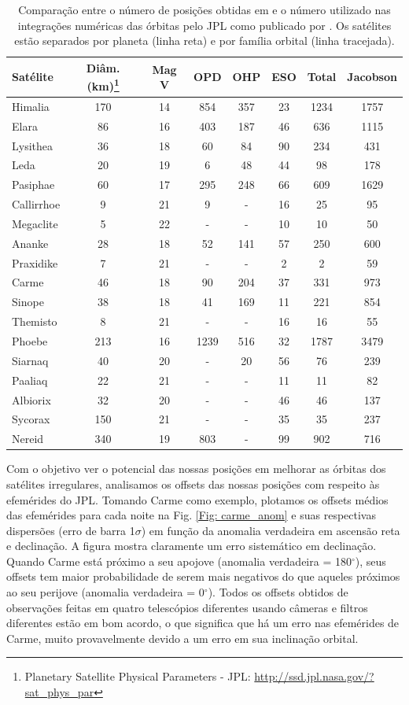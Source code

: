 \documentclass[12pt,a4paper]{monografia}
\newcommand{\degr}{\ensuremath{^{\circ}}}%
\begin{document}
\begin{table}[h]
\caption{\label{Tab: comparison-horizons} Comparação entre o número de posições obtidas em \cite{GomesJunior2015-Irregular} e o número utilizado nas integrações numéricas das órbitas pelo JPL como publicado por  \cite{Jacobson2012}. Os satélites estão separados por planeta (linha reta) e por família orbital (linha tracejada).}
\begin{centering}
\begin{tabular}{lccccccc}
\hline  \hline
Satélite & Diâm. (km)\footnote{Planetary Satellite Physical Parameters - JPL: \url{http://ssd.jpl.nasa.gov/?sat_phys_par}} & Mag V  & OPD  & OHP & ESO & Total  & Jacobson \tabularnewline
\hline
Himalia & 170 & 14 & 854 & 357 & 23 & 1234 & 1757 \tabularnewline
Elara & 86 & 16 & 403 & 187 & 46 & 636 & 1115 \tabularnewline
Lysithea & 36 & 18 & 60 & 84 & 90 & 234 & 431 \tabularnewline
Leda & 20 & 19 & 6 & 48 & 44 & 98 & 178 \tabularnewline
\hdashline
Pasiphae & 60 & 17 & 295 & 248 & 66 & 609 & 1629 \tabularnewline
Callirrhoe & 9 & 21 & 9 & -  &  16 & 25 & 95 \tabularnewline
Megaclite & 5 & 22 & - & -  &  10 & 10 & 50  \tabularnewline
\hdashline
Ananke & 28 & 18 & 52 & 141 & 57 & 250 & 600 \tabularnewline
Praxidike & 7 & 21 & - & -  &   2 & 2 & 59 \tabularnewline
\hdashline
Carme & 46 & 18 & 90 & 204 & 37 & 331 & 973 \tabularnewline
Sinope & 38 & 18 & 41 & 169 & 11 & 221 & 854 \tabularnewline
Themisto & 8 & 21 & - & - & 16 & 16 & 55 \tabularnewline
\hline
Phoebe & 213 & 16 & 1239 & 516 & 32 & 1787 & 3479 \tabularnewline
\hdashline
Siarnaq & 40 & 20 & - & 20 & 56 & 76 & 239 \tabularnewline
Paaliaq & 22 & 21 & - & - & 11 & 11 & 82 \tabularnewline
\hdashline
Albiorix & 32 & 20 & - & - & 46 & 46 & 137 \tabularnewline
\hline
Sycorax & 150 & 21 & - & - & 35 & 35 & 237 \tabularnewline
\hline
Nereid & 340 & 19 & 803 & - & 99 & 902 & 716 \tabularnewline
\hline
\end{tabular}
\par\end{centering}
\end{table}

Com o objetivo ver o potencial das nossas posições em melhorar as órbitas dos satélites irregulares, analisamos os offsets das nossas posições com respeito às efemérides do JPL. Tomando Carme como exemplo, plotamos os offsets médios das efemérides para cada noite na Fig. \ref{Fig: carme_anom} e suas respectivas dispersões (erro de barra 1$\sigma$) em função da anomalia verdadeira em ascensão reta e declinação. A figura mostra claramente um erro sistemático em declinação. Quando Carme está próximo a seu apojove (anomalia verdadeira = 180$\degr$), seus offsets tem maior probabilidade de serem mais negativos do que aqueles próximos ao seu perijove (anomalia verdadeira = 0$\degr$). Todos os offsets obtidos de observações feitas em quatro telescópios diferentes usando câmeras e filtros diferentes estão em bom acordo, o que significa que há um erro nas efemérides de Carme, muito provavelmente devido a um erro em sua inclinação orbital.
\end{document}
